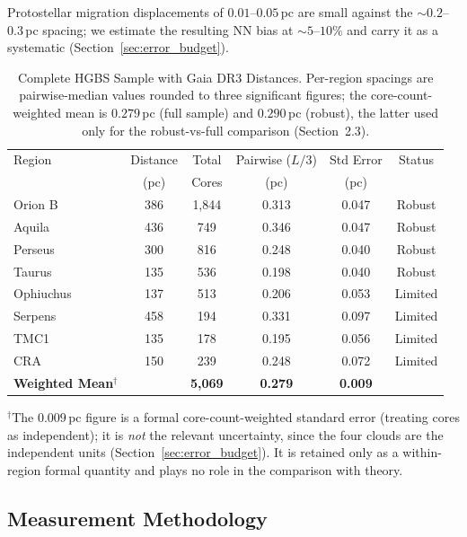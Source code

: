 \documentclass[usenatbib,twoside,twocolumn]{mnras}
\begin{document}
Protostellar migration displacements of $0.01$--$0.05$\,pc \citep{Kirk2016, Mattern2018} are small against the $\sim0.2$--$0.3$\,pc spacing; we estimate the resulting NN bias at $\sim5$--$10\%$ and carry it as a systematic (Section~\ref{sec:error_budget}).

\begin{table}
\caption{Complete HGBS Sample with Gaia DR3 Distances. Per-region spacings are pairwise-median values rounded to three significant figures; the core-count-weighted mean is $0.279$\,pc (full sample) and $0.290$\,pc (robust), the latter used only for the robust-vs-full comparison (Section~2.3).}
\label{tab:sample}
\begin{tabular}{lccccc}
\toprule
Region & Distance & Total & Pairwise ($L/3$) & Std Error & Status \\
       & (pc)   & Cores & (pc)   & (pc)      &  \\
\midrule
Orion B  & 386 & 1,844 & 0.313 & 0.047 & Robust \\
Aquila   & 436 & 749   & 0.346 & 0.047 & Robust \\
Perseus  & 300 & 816   & 0.248 & 0.040 & Robust \\
Taurus   & 135 & 536   & 0.198 & 0.040 & Robust \\
Ophiuchus& 137 & 513   & 0.206 & 0.053 & Limited \\
Serpens  & 458 & 194   & 0.331 & 0.097 & Limited \\
TMC1     & 135 & 178   & 0.195 & 0.056 & Limited \\
CRA      & 150 & 239   & 0.248 & 0.072 & Limited \\
\midrule
\textbf{Weighted Mean}$^\dagger$ &  & \textbf{5,069} & \textbf{0.279} & \textbf{0.009} &  \\
\bottomrule
\end{tabular}
\par\vspace{2pt}
\footnotesize $^\dagger$The $0.009$\,pc figure is a formal core-count-weighted standard error (treating cores as independent); it is \emph{not} the relevant uncertainty, since the four clouds are the independent units (Section~\ref{sec:error_budget}). It is retained only as a within-region formal quantity and plays no role in the comparison with theory.
\end{table}

\subsection{Measurement Methodology}
\label{sec:methodology}
\end{document}
